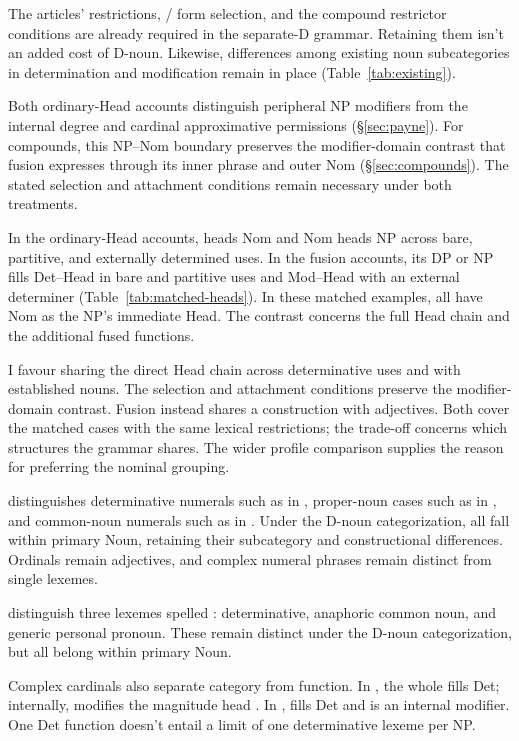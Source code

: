 \documentclass[12pt]{article}
\begin{document}
The articles' restrictions, / form selection, and the compound restrictor conditions are already required in the separate-D grammar. Retaining them isn't an added cost of D-noun. Likewise, differences among existing noun subcategories in determination and modification remain in place (Table~\ref{tab:existing}).

Both ordinary-Head accounts distinguish peripheral NP modifiers from the internal degree and cardinal approximative permissions (§\ref{sec:payne}). For compounds, this NP--Nom boundary preserves the modifier-domain contrast that fusion expresses through its inner phrase and outer Nom (§\ref{sec:compounds}). The stated selection and attachment conditions remain necessary under both treatments.

In the ordinary-Head accounts,  heads Nom and Nom heads NP across bare, partitive, and externally determined uses. In the fusion accounts, its DP or NP fills Det--Head in bare and partitive uses and Mod--Head with an external determiner (Table~\ref{tab:matched-heads}). In these matched examples, all have Nom as the NP's immediate Head. The contrast concerns the full Head chain and the additional fused functions.

I favour sharing the direct Head chain across determinative uses and with established nouns. The selection and attachment conditions preserve the modifier-domain contrast. Fusion instead shares a construction with adjectives. Both cover the matched cases with the same lexical restrictions; the trade-off concerns which structures the grammar shares. The wider profile comparison supplies the reason for preferring the nominal grouping.

\textcite{reynolds2026numerals} distinguishes determinative numerals such as  in , proper-noun cases such as  in , and common-noun numerals such as  in . Under the D-noun categorization, all fall within primary Noun, retaining their subcategory and constructional differences. Ordinals remain adjectives, and complex numeral phrases remain distinct from single lexemes.

\textcite[797--798]{payne2013anaphoric} distinguish three lexemes spelled : determinative, anaphoric common noun, and generic personal pronoun. These remain distinct under the D-noun categorization, but all belong within primary Noun.

Complex cardinals also separate category from function. In , the whole  fills Det; internally,  modifies the magnitude head  \citep[§4]{reynolds2026numerals}. In ,  fills Det and  is an internal modifier. One Det function doesn't entail a limit of one determinative lexeme per NP.
\end{document}
